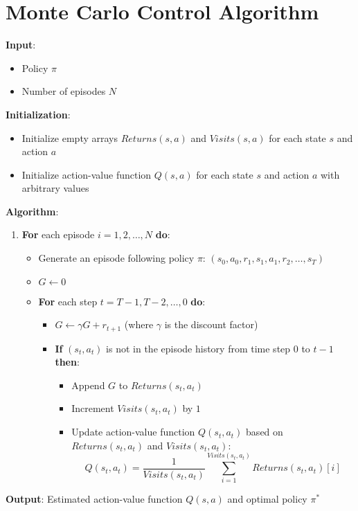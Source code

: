 \documentclass{article}
\begin{document}
\section*{Monte Carlo Control Algorithm}

\textbf{Input}:
\begin{itemize}
    \item Policy \( \pi \)
    \item Number of episodes \( N \)
\end{itemize}

\textbf{Initialization}:
\begin{itemize}
    \item Initialize empty arrays \( Returns(s, a) \) and \( Visits(s, a) \) for each state \( s \) and action \( a \)
    \item Initialize action-value function \( Q(s, a) \) for each state \( s \) and action \( a \) with arbitrary values
\end{itemize}

\textbf{Algorithm}:
\begin{enumerate}
    \item \textbf{For} each episode \( i = 1, 2, \ldots, N \) \textbf{do}:
        \begin{itemize}
            \item Generate an episode following policy \( \pi \): \( (s_0, a_0, r_1, s_1, a_1, r_2, \ldots, s_T) \)
            \item \( G \leftarrow 0 \)
            \item \textbf{For} each step \( t = T-1, T-2, \ldots, 0 \) \textbf{do}:
                \begin{itemize}
                    \item \( G \leftarrow \gamma G + r_{t+1} \) \quad (where \( \gamma \) is the discount factor)
                    \item \textbf{If} \( (s_t, a_t) \) is not in the episode history from time step \( 0 \) to \( t-1 \) \textbf{then}:
                        \begin{itemize}
                            \item Append \( G \) to \( Returns(s_t, a_t) \)
                            \item Increment \( Visits(s_t, a_t) \) by \( 1 \)
                            \item Update action-value function \( Q(s_t, a_t) \) based on \( Returns(s_t, a_t) \) and \( Visits(s_t, a_t) \):
                                \[
                                Q(s_t, a_t) = \frac{1}{Visits(s_t, a_t)} \sum_{i=1}^{Visits(s_t, a_t)} Returns(s_t, a_t)[i]
                                \]
                        \end{itemize}
                \end{itemize}
        \end{itemize}
\end{enumerate}

\textbf{Output}: Estimated action-value function \( Q(s, a) \) and optimal policy \( \pi^* \)
\end{document}
